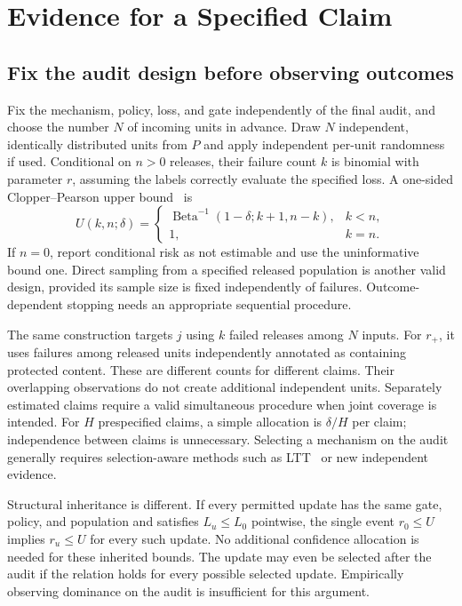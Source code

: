 \documentclass[conference]{IEEEtran}
\begin{document}
\section{Evidence for a Specified Claim}
\subsection{Fix the audit design before observing outcomes}
Fix the mechanism, policy, loss, and gate independently of the final audit, and choose the number $N$ of incoming units in advance. Draw $N$ independent, identically distributed units from $P$ and apply independent per-unit randomness if used. Conditional on $n>0$ releases, their failure count $k$ is binomial with parameter $r$, assuming the labels correctly evaluate the specified loss. A one-sided Clopper--Pearson upper bound~\cite{clopper1934} is
\begin{equation}
 U(k,n;\delta)=
 \begin{cases}
 \operatorname{Beta}^{-1}(1-\delta;k+1,n-k),&k<n,\\
 1,&k=n.
 \end{cases}
 \label{eq:cp}
\end{equation}
If $n=0$, report conditional risk as not estimable and use the uninformative bound one. Direct sampling from a specified released population is another valid design, provided its sample size is fixed independently of failures. Outcome-dependent stopping needs an appropriate sequential procedure.

The same construction targets $j$ using $k$ failed releases among $N$ inputs. For $r_+$, it uses failures among released units independently annotated as containing protected content. These are different counts for different claims. Their overlapping observations do not create additional independent units. Separately estimated claims require a valid simultaneous procedure when joint coverage is intended. For $H$ prespecified claims, a simple allocation is $\delta/H$ per claim; independence between claims is unnecessary. Selecting a mechanism on the audit generally requires selection-aware methods such as LTT~\cite{angelopoulos2025} or new independent evidence.

Structural inheritance is different. If every permitted update has the same gate, policy, and population and satisfies $L_u\leq L_0$ pointwise, the single event $r_0\leq U$ implies $r_u\leq U$ for every such update. No additional confidence allocation is needed for these inherited bounds. The update may even be selected after the audit if the relation holds for every possible selected update. Empirically observing dominance on the audit is insufficient for this argument.
\end{document}
